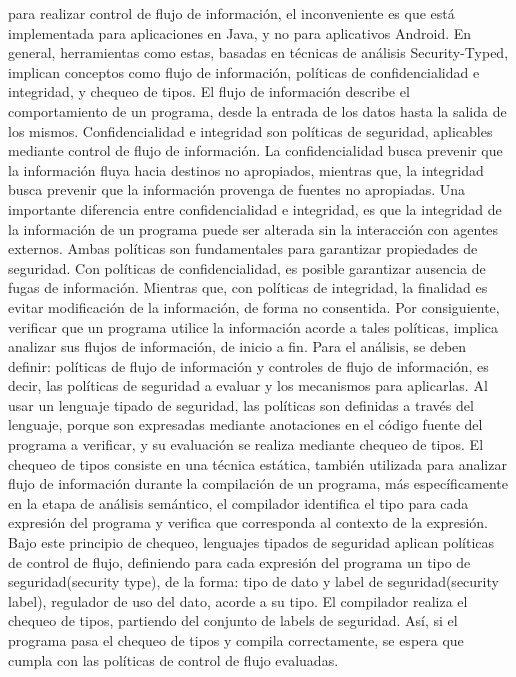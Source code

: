 para realizar control de flujo de información, el inconveniente es que está
implementada para aplicaciones en Java, y no para aplicativos Android.\newline 
En general, herramientas como estas, basadas en técnicas de análisis
Security-Typed, implican conceptos como flujo de información, políticas de
confidencialidad e integridad, y chequeo de tipos.\newline 
El flujo de información describe el comportamiento de un programa, desde la
entrada de los datos hasta la salida de los mismos.\newline 
Confidencialidad e integridad son políticas de seguridad, aplicables mediante
control de flujo de información. La confidencialidad busca prevenir que la
información fluya hacia destinos no apropiados, mientras que, la integridad
busca prevenir que la información provenga de fuentes no apropiadas. Una
importante diferencia entre confidencialidad e integridad, es que la integridad
de la información de un programa puede ser alterada sin la interacción con
agentes externos.\newline %
Ambas políticas son fundamentales para garantizar propiedades de seguridad. Con
políticas de confidencialidad, es posible garantizar ausencia de fugas de
información. Mientras que, con políticas de integridad, la finalidad es evitar
modificación de la información, de forma no consentida.\newline
Por consiguiente, verificar que un programa utilice la información acorde a
tales políticas, implica analizar sus flujos de información, de inicio a fin.
Para el análisis, se deben definir: políticas de flujo de información y
controles de flujo de información, es decir, las políticas de seguridad a
evaluar y los mecanismos para aplicarlas.\newline 
Al usar un lenguaje tipado de seguridad, las políticas son definidas a través
del lenguaje, porque son expresadas mediante anotaciones en el código fuente del
programa a verificar, y su evaluación se realiza mediante chequeo de tipos. El
chequeo de tipos consiste en una técnica estática, también utilizada para
analizar flujo de información durante la compilación de un programa, más
específicamente en la etapa de análisis semántico, el compilador identifica el
tipo para cada expresión del programa y verifica que corresponda al contexto de
la expresión.
Bajo este principio de chequeo, lenguajes tipados de seguridad aplican
políticas de control de flujo, definiendo para cada expresión del programa un
tipo de seguridad(security type), de la forma:  tipo de dato y label de
seguridad(security label), regulador de uso del dato, acorde a su tipo. El
compilador realiza el chequeo de tipos, partiendo del conjunto de labels de
seguridad. Así, si el programa pasa el chequeo de tipos y compila correctamente,
se espera que cumpla con las políticas de control de flujo evaluadas.